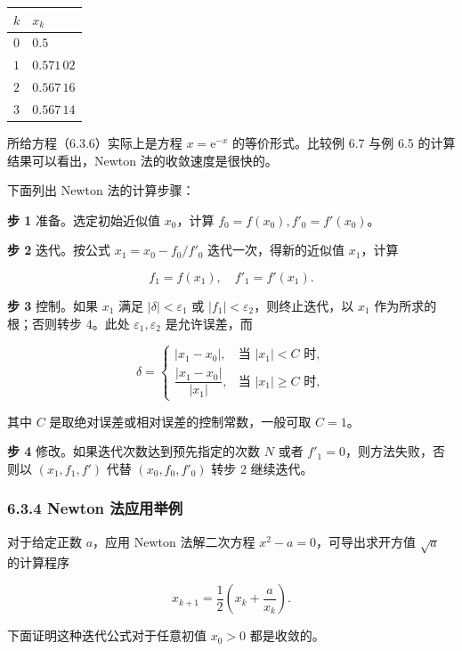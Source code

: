 \documentclass[
  10pt,
  fontset=fandol]{ctexart}
\newcounter{none} %
\begin{document}
{\def\LTcaptype{none} %
\begin{longtable}[]{@{}ll@{}}
\toprule\noalign{}
\(k\) & \(x_k\) \\
\midrule\noalign{}
\endhead
\bottomrule\noalign{}
\endlastfoot
\(0\) & \(0.5\) \\
\(1\) & \(0.571\,02\) \\
\(2\) & \(0.567\,16\) \\
\(3\) & \(0.567\,14\) \\
\end{longtable}
}

所给方程（6.3.6）实际上是方程 \(x=\mathrm{e}^{-x}\) 的等价形式。比较例 6.7 与例 6.5 的计算结果可以看出，Newton 法的收敛速度是很快的。

下面列出 Newton 法的计算步骤：

\textbf{步 1} 准备。选定初始近似值 \(x_0\)，计算 \(f_0=f(x_0),f'_0=f'(x_0)\)。

\textbf{步 2} 迭代。按公式 \(x_1=x_0-f_0/f'_0\) 迭代一次，得新的近似值 \(x_1\)，计算

\[
f_1=f(x_1),\quad f'_1=f'(x_1).
\]

\textbf{步 3} 控制。如果 \(x_1\) 满足 \(|\delta|<\varepsilon_1\) 或 \(|f_1|<\varepsilon_2\)，则终止迭代，以 \(x_1\) 作为所求的根；否则转步 4。此处 \(\varepsilon_1,\varepsilon_2\) 是允许误差，而

\[
\delta=\begin{cases}
|x_1-x_0|,&\text{当 }|x_1|<C\text{ 时},\\
\dfrac{|x_1-x_0|}{|x_1|},&\text{当 }|x_1|\geqslant C\text{ 时},
\end{cases}
\]

其中 \(C\) 是取绝对误差或相对误差的控制常数，一般可取 \(C=1\)。

\textbf{步 4} 修改。如果迭代次数达到预先指定的次数 \(N\) 或者 \(f'_1=0\)，则方法失败，否则以 \((x_1,f_1,f')\) 代替 \((x_0,f_0,f'_0)\) 转步 2 继续迭代。

\subsubsection{6.3.4 Newton 法应用举例}\label{newton-ux6cd5ux5e94ux7528ux4e3eux4f8b}

对于给定正数 \(a\)，应用 Newton 法解二次方程 \(x^2-a=0\)，可导出求开方值 \(\sqrt{a}\) 的计算程序

\[
x_{k+1}=\frac{1}{2}\left(x_k+\frac{a}{x_k}\right).
\tag{6.3.7}
\]

下面证明这种迭代公式对于任意初值 \(x_0>0\) 都是收敛的。
\end{document}
